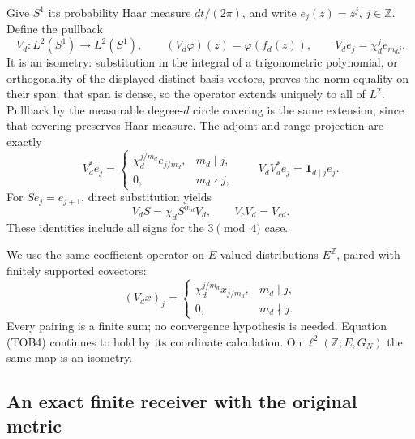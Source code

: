 Give $S^1$ its probability Haar measure $dt/(2\pi)$, and write
$e_j(z)=z^j$, $j\in\mathbb Z$. Define the pullback
\begin{equation}\tag{TOB2}
 V_d:L^2(S^1)\longrightarrow L^2(S^1),\qquad
 (V_d\varphi)(z)=\varphi(f_d(z)),\qquad
 V_de_j=\chi_d^je_{m_dj}.
\end{equation}
It is an isometry: substitution in the integral of a trigonometric
polynomial, or orthogonality of the displayed distinct basis vectors,
proves the norm equality on their span; that span is dense, so the
operator extends uniquely to all of $L^2$. Pullback by the measurable
degree-$d$ circle covering is the same extension, since that covering
preserves Haar measure. The adjoint and range projection are exactly
\begin{equation}\tag{TOB3}
 V_d^*e_j=
 \begin{cases}\chi_d^{j/m_d}e_{j/m_d},&m_d\mid j,\\0,&m_d\nmid j,
 \end{cases}
 \qquad
 V_dV_d^*e_j=\mathbf1_{d\mid j}e_j.
\end{equation}
For $S e_j=e_{j+1}$, direct substitution yields
\begin{equation}\tag{TOB4}
 V_dS=\chi_d S^{m_d}V_d,\qquad V_cV_d=V_{cd}.
\end{equation}
These identities include all signs for the $3\pmod4$ case.

We use the same coefficient operator on $E$-valued distributions
$E^{\mathbb Z}$, paired with finitely supported covectors:
\begin{equation}\tag{TOB5}
 (V_dx)_j=
 \begin{cases}\chi_d^{j/m_d}x_{j/m_d},&m_d\mid j,\\0,&m_d\nmid j.
 \end{cases}
\end{equation}
Every pairing is a finite sum; no convergence hypothesis is needed.
Equation (TOB4) continues to hold by its coordinate calculation.
On $\ell^2(\mathbb Z;E,G_N)$ the same map is an isometry.

\subsection{An exact finite receiver with the original metric}

